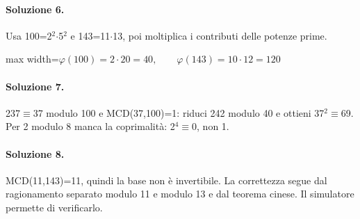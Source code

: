 \documentclass[a4paper,11pt]{article}
\begin{document}
\paragraph{Soluzione 6.} Usa 100=2$^{2}$$\cdot$5$^{2}$ e 143=11$\cdot$13, poi moltiplica i contributi delle potenze prime.
\begin{center}\begin{adjustbox}{max width=\linewidth}$\displaystyle \varphi(100)=2\cdot20=40,\qquad\varphi(143)=10\cdot12=120$\end{adjustbox}\end{center}

\paragraph{Soluzione 7.} 237$\equiv$37 modulo 100 e MCD(37,100)=1: riduci 242 modulo 40 e ottieni 37$^{2}$$\equiv$69. Per 2 modulo 8 manca la coprimalità: 2$^{4}$$\equiv$0, non 1.

\paragraph{Soluzione 8.} MCD(11,143)=11, quindi la base non è invertibile. La correttezza segue dal ragionamento separato modulo 11 e modulo 13 e dal teorema cinese. Il simulatore permette di verificarlo.
\end{document}
